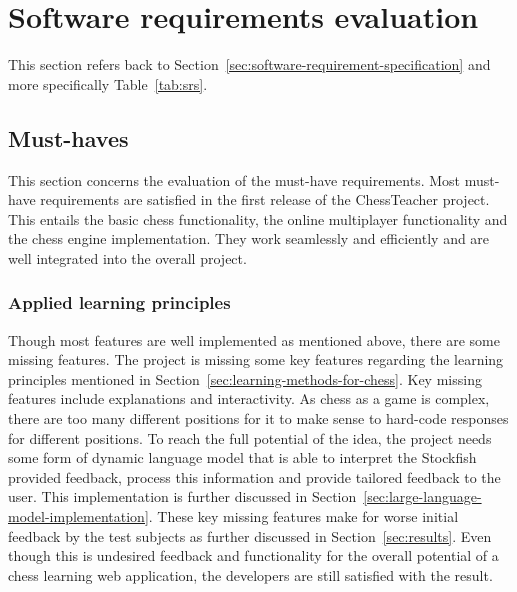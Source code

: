\section{Software requirements evaluation}\label{sec:software-requirements-evaluation}

This section refers back to Section~\ref{sec:software-requirement-specification} and more specifically
Table~\ref{tab:srs}.


\subsection{Must-haves}\label{subsec:must-haves}

This section concerns the evaluation of the must-have requirements.
Most must-have requirements are satisfied in the first release of the ChessTeacher project.
This entails the basic chess functionality, the online multiplayer functionality and the chess engine implementation.
They work seamlessly and efficiently and are well integrated into the overall project.


\subsubsection{Applied learning principles}

Though most features are well implemented as mentioned above, there are some missing features.
The project is missing some key features regarding the learning principles mentioned in
Section~\ref{sec:learning-methods-for-chess}.
Key missing features include explanations and interactivity.
As chess as a game is complex, there are too many different positions for it to make sense to hard-code responses for
different positions.
To reach the full potential of the idea, the project needs some form of dynamic language model that is able to interpret
the Stockfish provided feedback, process this information and provide tailored feedback to the user.
This implementation is further discussed in Section~\ref{sec:large-language-model-implementation}.
These key missing features make for worse initial feedback by the test subjects as further discussed in
Section~\ref{sec:results}.
Even though this is undesired feedback and functionality for the overall potential of a chess learning web
application, the developers are still satisfied with the result.


